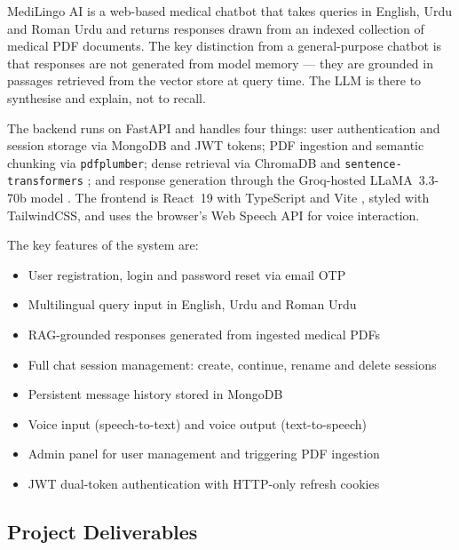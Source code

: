 MediLingo AI is a web-based medical chatbot that takes queries in English, Urdu and Roman
Urdu and returns responses drawn from an indexed collection of medical PDF documents. The
key distinction from a general-purpose chatbot is that responses are not generated from
model memory --- they are grounded in passages retrieved from the vector store at query
time. The LLM is there to synthesise and explain, not to recall.

The backend runs on FastAPI \cite{fastapi2018} and handles four things: user authentication
and session storage via MongoDB \cite{mongodb2024} and JWT tokens; PDF ingestion and
semantic chunking via \texttt{pdfplumber}; dense retrieval via ChromaDB \cite{chromadb2023}
and \texttt{sentence-transformers} \cite{sentencetransformers2019}; and response generation
through the Groq-hosted LLaMA~3.3-70b model \cite{groq2024}. The frontend is React~19 with
TypeScript and Vite \cite{react2024}, styled with TailwindCSS, and uses the browser's Web
Speech API for voice interaction.

The key features of the system are:

\begin{itemize}
  \item User registration, login and password reset via email OTP
  \item Multilingual query input in English, Urdu and Roman Urdu
  \item RAG-grounded responses generated from ingested medical PDFs
  \item Full chat session management: create, continue, rename and delete sessions
  \item Persistent message history stored in MongoDB
  \item Voice input (speech-to-text) and voice output (text-to-speech)
  \item Admin panel for user management and triggering PDF ingestion
  \item JWT dual-token authentication with HTTP-only refresh cookies
\end{itemize}

\subsection{Project Deliverables}

